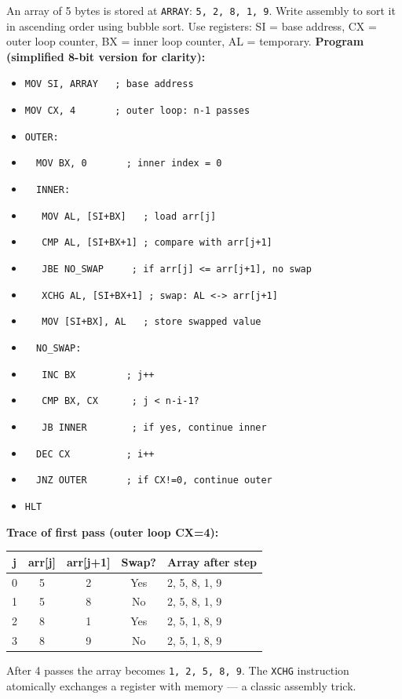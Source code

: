 \documentclass[11pt]{article}
\begin{document}
\begin{exoresolu}
An array of 5 bytes is stored at \texttt{ARRAY}: \texttt{5, 2, 8, 1, 9}. Write assembly to sort it in ascending order using bubble sort. Use registers: SI = base address, CX = outer loop counter, BX = inner loop counter, AL = temporary.
\tcblower
\textbf{Program (simplified 8-bit version for clarity):}
\begin{itemize}
\item[] \texttt{MOV SI, ARRAY\ \ \ ; base address}
\item[] \texttt{MOV CX, 4\ \ \ \ \ \ \ ; outer loop: n-1 passes}
\item[] \texttt{OUTER:}
\item[] \texttt{\ \ MOV BX, 0\ \ \ \ \ \ \ ; inner index = 0}
\item[] \texttt{\ \ INNER:}
\item[] \texttt{\ \ \ MOV AL, [SI+BX]\ \ \ ; load arr[j]}
\item[] \texttt{\ \ \ CMP AL, [SI+BX+1] ; compare with arr[j+1]}
\item[] \texttt{\ \ \ JBE NO\_SWAP\ \ \ \ \ ; if arr[j] <= arr[j+1], no swap}
\item[] \texttt{\ \ \ XCHG AL, [SI+BX+1] ; swap: AL <-> arr[j+1]}
\item[] \texttt{\ \ \ MOV [SI+BX], AL\ \ \ ; store swapped value}
\item[] \texttt{\ \ NO\_SWAP:}
\item[] \texttt{\ \ \ INC BX\ \ \ \ \ \ \ \ \ ; j++}
\item[] \texttt{\ \ \ CMP BX, CX\ \ \ \ \ \ ; j < n-i-1?}
\item[] \texttt{\ \ \ JB INNER\ \ \ \ \ \ \ \ ; if yes, continue inner}
\item[] \texttt{\ \ DEC CX\ \ \ \ \ \ \ \ \ \ ; i++}
\item[] \texttt{\ \ JNZ OUTER\ \ \ \ \ \ \ ; if CX!=0, continue outer}
\item[] \texttt{HLT}
\end{itemize}
\textbf{Trace of first pass (outer loop CX=4):}
\begin{center}
\begin{tabular}{|c|c|c|c|l|}
\hline
\rowcolor{popblueL} j & arr[j] & arr[j+1] & Swap? & Array after step \\ \hline
0 & 5 & 2 & Yes & 2, 5, 8, 1, 9 \\ \hline
1 & 5 & 8 & No & 2, 5, 8, 1, 9 \\ \hline
2 & 8 & 1 & Yes & 2, 5, 1, 8, 9 \\ \hline
3 & 8 & 9 & No & 2, 5, 1, 8, 9 \\ \hline
\end{tabular}
\end{center}
After 4 passes the array becomes \texttt{1, 2, 5, 8, 9}. The \texttt{XCHG} instruction atomically exchanges a register with memory — a classic assembly trick.
\end{exoresolu}
\end{document}

